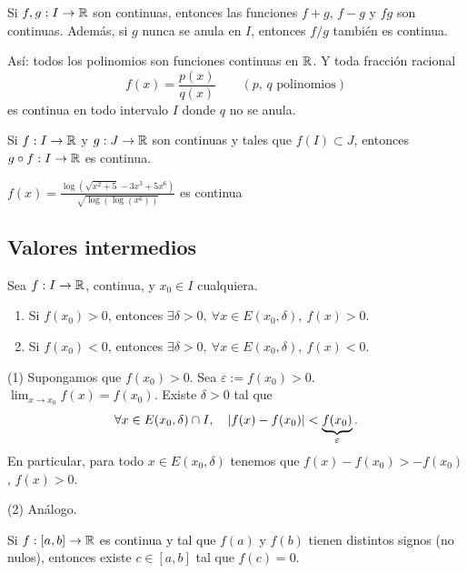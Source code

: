 \documentclass[11pt,a4paper]{article}
\begin{document}
\begin{proposicion}
Si $f,g:I\to\mathbb{R}$ son continuas, entonces las funciones $f+g$, $f-g$ y $fg$ son continuas. Además, si $g$ nunca se anula en $I$, entonces $f/g$ también es continua.
\end{proposicion}

Así: todos los polinomios son funciones continuas en $\mathbb{R}$. Y toda fracción racional
\[
  f(x)=\frac{p(x)}{q(x)}\qquad(p,\,q \text{ polinomios})
\]
es continua en todo intervalo $I$ donde $q$ no se anula.

\begin{proposicion}
Si $f:I\to\mathbb{R}$ y $g:J\to\mathbb{R}$ son continuas y tales que $f(I)\subset J$, entonces $g\circ f:I\to\mathbb{R}$ es continua.
\end{proposicion}

\begin{ejemplo}
\begin{center}
$\displaystyle f(x)=\frac{\log\left(\sqrt{x^2+5}-3x^3+5x^6\right)}{\sqrt{\log\left(\log(x^6)\right)}}$
\quad es continua
\end{center}
\end{ejemplo}

\subsection{Valores intermedios}

\begin{lema}
Sea $f:I\to\mathbb{R}$, continua, y $x_0\in I$ cualquiera.
\begin{enumerate}[label=(\arabic*)]
  \item Si $f(x_0)>0$, entonces $\exists\delta>0,\ \forall x\in E(x_0,\delta),\ f(x)>0$.
  \item Si $f(x_0)<0$, entonces $\exists\delta>0,\ \forall x\in E(x_0,\delta),\ f(x)<0$.
\end{enumerate}
\end{lema}

\begin{demo}
(1) Supongamos que $f(x_0)>0$. Sea $\varepsilon:=f(x_0)>0$. $\displaystyle\lim_{x\to x_0}f(x)=f(x_0)$. Existe $\delta>0$ tal que
\[
  \forall x\in E(x_0,\delta)\cap I,\quad \lvert f(x)-f(x_0)\rvert<\underbrace{f(x_0)}_{\varepsilon}.
\]
En particular, para todo $x\in E(x_0,\delta)$ tenemos que $f(x)-f(x_0)>-f(x_0)$, $f(x)>0$.

(2) Análogo.
\end{demo}

\begin{teorema}[Bolzano]
Si $f:[a,b]\to\mathbb{R}$ es continua y tal que $f(a)$ y $f(b)$ tienen distintos signos (no nulos), entonces existe $c\in[a,b]$ tal que $f(c)=0$.
\end{teorema}
\end{document}
